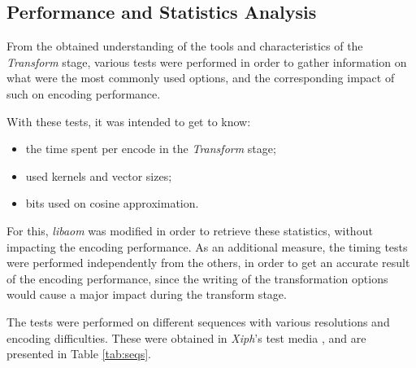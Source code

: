 \subsection{Performance and Statistics Analysis}

From the obtained understanding of the tools and characteristics of the \emph{Transform} stage, various tests were performed in order to gather information on what were the most commonly used options, and the corresponding impact of such on encoding performance.

With these tests, it was intended to get to know:
\begin{itemize}
    \item the time spent per encode in the \emph{Transform} stage;
    \item used kernels and vector sizes;
    \item bits used on cosine approximation.
\end{itemize}

For this, \emph{libaom} was modified in order to retrieve these statistics, without impacting the encoding performance. As an additional measure, the timing tests were performed independently from the others, in order to get an accurate result of the encoding performance, since the writing of the transformation options would cause a major impact during the transform stage.

The tests were performed on different sequences with various resolutions and encoding difficulties. These were obtained in \emph{Xiph}'s test media \cite{XiphOrgTest}, and are presented in Table \ref{tab:seqs}.

